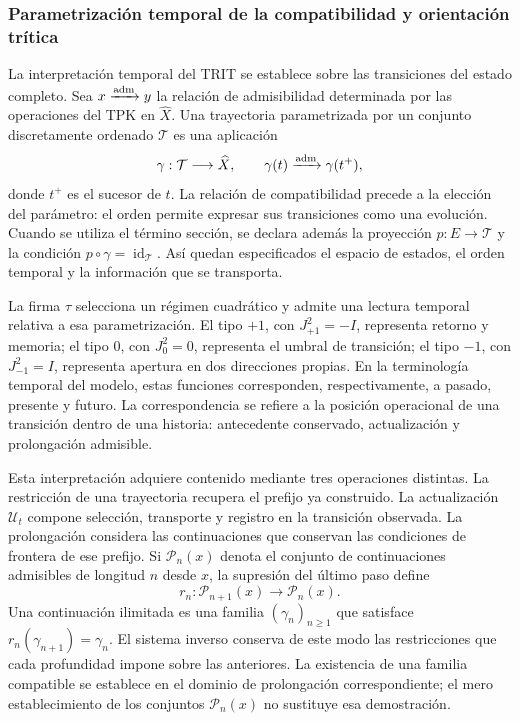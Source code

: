 \subsubsection{Parametrización temporal de la compatibilidad y orientación trítica}
\label{trit-temporal-compatibilidad}

La interpretación temporal del TRIT se establece sobre las transiciones del
estado completo. Sea \(x\xrightarrow{\rm adm}y\) la relación de admisibilidad determinada
por las operaciones del TPK en \(\widehat X\). Una trayectoria parametrizada
por un conjunto discretamente ordenado \(\mathcal T\) es una aplicación
\[
 \gamma:\mathcal T\longrightarrow\widehat X,\qquad
 \gamma(t)\xrightarrow{\rm adm}\gamma(t^+),
\]
donde \(t^+\) es el sucesor de \(t\). La relación de compatibilidad precede a
la elección del parámetro: el orden permite expresar sus transiciones como
una evolución. Cuando se utiliza el término sección, se declara además la
proyección \(p:E\to\mathcal T\) y la condición
\(p\circ\gamma=\operatorname{id}_{\mathcal T}\). Así quedan especificados
el espacio de estados, el orden temporal y la información que se transporta.

La firma \(\tau\) selecciona un régimen cuadrático y admite una lectura
temporal relativa a esa parametrización. El tipo \(+1\), con
\(J_{+1}^{2}=-I\), representa retorno y memoria; el tipo \(0\), con
\(J_0^{2}=0\), representa el umbral de transición; el tipo \(-1\), con
\(J_{-1}^{2}=I\), representa apertura en dos direcciones propias. En la
terminología temporal del modelo, estas funciones corresponden,
respectivamente, a pasado, presente y futuro. La correspondencia se refiere
a la posición operacional de una transición dentro de una historia:
antecedente conservado, actualización y prolongación admisible.

Esta interpretación adquiere contenido mediante tres operaciones distintas.
La restricción de una trayectoria recupera el prefijo ya construido. La
actualización \(\mathcal U_t\) compone selección, transporte y registro en
la transición observada. La prolongación considera las continuaciones que
conservan las condiciones de frontera de ese prefijo. Si
\(\mathcal P_n(x)\) denota el conjunto de continuaciones admisibles de
longitud \(n\) desde \(x\), la supresión del último paso define
\[
 r_n:\mathcal P_{n+1}(x)\longrightarrow\mathcal P_n(x).
\]
Una continuación ilimitada es una familia \((\gamma_n)_{n\geq1}\) que
satisface \(r_n(\gamma_{n+1})=\gamma_n\). El sistema inverso conserva de
este modo las restricciones que cada profundidad impone sobre las
anteriores. La existencia de una familia compatible se establece en el
dominio de prolongación correspondiente; el mero establecimiento de los
conjuntos \(\mathcal P_n(x)\) no sustituye esa demostración.

